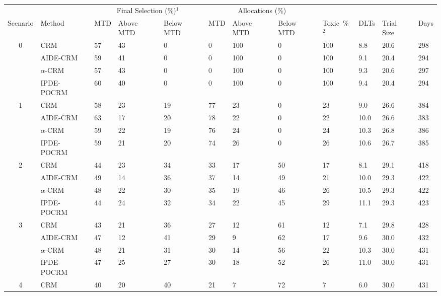 \begin{tabular*}{\textwidth}{@{\extracolsep\fill}clllllllllll@{\extracolsep\fill}}
\toprule
&  & \multicolumn{3}{c}{Final Selection (\%)$^1$} & \multicolumn{3}{c}{Allocations (\%)} & &  &  &  \\
\multirow{2}{2em}{Scenario} & \multirow{2}{2em}{Method} & \multirow{2}{2em}{MTD} & \multirow{2}{2em}{Above MTD} & \multirow{2}{2em}{Below MTD} & \multirow{2}{2em}{MTD} & \multirow{2}{2em}{Above MTD} & \multirow{2}{2em}{Below MTD} & \multirow{2}{2em}{Toxic~\%$^2$} & \multirow{2}{2em}{DLTs} & \multirow{2}{2em}{Trial Size} & \multirow{2}{2em}{Days}  \\ \\ 
\midrule
\multirow{4}{2em}{0} & CRM & 57 & 43 & 0 & 0 & 100 & 0 & 100 & 8.8 & 20.6 & 298\\
 & AIDE-CRM & 59 & 41 & 0 & 0 & 100 & 0 & 100 & 9.1 & 20.4 & 294\\
 & $\alpha$-CRM & 57 & 43 & 0 & 0 & 100 & 0 & 100 & 9.3 & 20.6 & 297\\
 & IPDE-POCRM & 60 & 40 & 0 & 0 & 100 & 0 & 100 & 9.4 & 20.4 & 294\\
\midrule
\multirow{4}{2em}{1} & CRM & 58 & 23 & 19 & 77 & 23 & 0 & 23 & 9.0 & 26.6 & 384\\
 & AIDE-CRM & 63 & 17 & 20 & 78 & 22 & 0 & 22 & 10.0 & 26.6 & 383\\
 & $\alpha$-CRM & 59 & 22 & 19 & 76 & 24 & 0 & 24 & 10.3 & 26.8 & 386\\
 & IPDE-POCRM & 59 & 21 & 20 & 74 & 26 & 0 & 26 & 10.6 & 26.7 & 385\\
\midrule
\multirow{4}{2em}{2} & CRM & 44 & 23 & 34 & 33 & 17 & 50 & 17 & 8.1 & 29.1 & 418\\
 & AIDE-CRM & 49 & 14 & 36 & 37 & 14 & 49 & 21 & 10.0 & 29.3 & 422\\
 & $\alpha$-CRM & 48 & 22 & 30 & 35 & 19 & 46 & 26 & 10.5 & 29.3 & 422\\
 & IPDE-POCRM & 44 & 24 & 32 & 34 & 22 & 45 & 29 & 11.1 & 29.3 & 423\\
\midrule
\multirow{4}{2em}{3} & CRM & 43 & 21 & 36 & 27 & 12 & 61 & 12 & 7.1 & 29.8 & 428\\
 & AIDE-CRM & 47 & 12 & 41 & 29 & 9 & 62 & 17 & 9.6 & 30.0 & 432\\
 & $\alpha$-CRM & 48 & 21 & 31 & 30 & 14 & 56 & 22 & 10.3 & 30.0 & 431\\
 & IPDE-POCRM & 47 & 25 & 27 & 30 & 18 & 52 & 26 & 11.0 & 30.0 & 431\\
\midrule
\multirow{4}{2em}{4} & CRM & 40 & 20 & 40 & 21 & 7 & 72 & 7 & 6.0 & 30.0 & 431\\

\end{tabular*}
